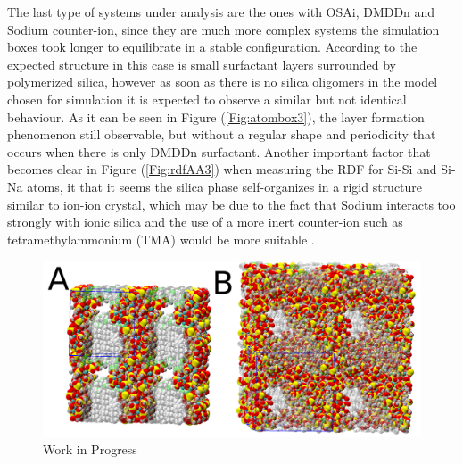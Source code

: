 \documentclass[10pt,a4paper,twoside]{article}
\begin{document}
The last type of systems under analysis are the ones with OSAi, DMDDn and Sodium counter-ion, since they are much more complex systems the simulation boxes took longer to equilibrate in a stable configuration. According to  the expected structure in this case is small surfactant layers surrounded by polymerized silica, however as soon as there is no silica oligomers in the model chosen for simulation it is expected to observe a similar but not identical behaviour. As it can be seen in Figure (\ref{Fig:atombox3}), the layer formation phenomenon still observable, but without a regular shape and periodicity that occurs when there is only DMDDn surfactant. Another important factor that becomes clear in Figure (\ref{Fig:rdfAA3}) when measuring the RDF for Si-Si and Si-Na atoms, it that it seems the silica phase self-organizes in a rigid structure similar to ion-ion crystal, which may be due to the fact that Sodium interacts too strongly with ionic silica and the use of a more inert counter-ion such as tetramethylammonium (TMA) would be more suitable \cite{mjsilica}.

\begin{figure}[H]
  \begin{center}
	\includegraphics[width=1 \textwidth]{./images/aa3}
	\caption{Work in Progress}
	\label{Fig:aa3}
  \end{center}
\end{figure}
\end{document}
